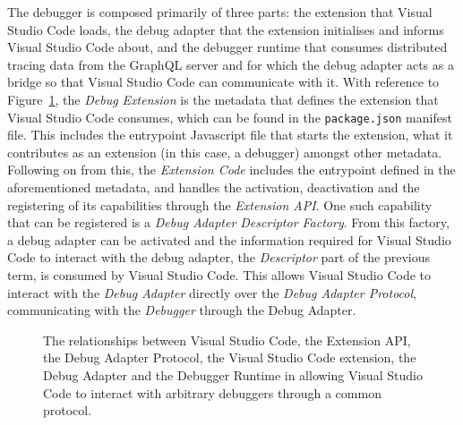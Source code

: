 \documentclass[12pt,pdftex,titlepage]{report}
\begin{document}
                The debugger is composed primarily of three parts: the extension that Visual Studio Code loads, the debug adapter that the extension initialises and informs Visual Studio Code about, and the debugger runtime
                that consumes distributed tracing data from the GraphQL server and for which the debug adapter acts as a bridge so that Visual Studio Code can communicate with it. With reference to Figure~\ref{fig:vscodedebug},
                the \textit{Debug Extension} is the metadata that defines the extension that Visual Studio Code consumes, which can be found in the \texttt{package.json} manifest file. This includes the entrypoint Javascript file 
                that starts the extension, what it contributes as an extension (in this case, a debugger) amongst other metadata. Following on from this, the \textit{Extension Code} includes the entrypoint defined in the 
                aforementioned metadata, and handles the activation, deactivation and the registering of its capabilities through the \textit{Extension API}. One such capability that can be registered is a \textit{Debug Adapter 
                Descriptor Factory}. From this factory, a debug adapter can be activated and the information required for Visual Studio Code to interact with the debug adapter, the \textit{Descriptor} part of the previous term, 
                is consumed by Visual Studio Code. This allows Visual Studio Code to interact with the \textit{Debug Adapter} directly over the \textit{Debug Adapter Protocol}, communicating with the \textit{Debugger} through the 
                Debug Adapter.

                \begin{figure}[hbt!]
                    \centering
                        \caption{The relationships between Visual Studio Code, the Extension API, the Debug Adapter Protocol, the Visual Studio Code extension, the Debug Adapter and the Debugger Runtime in allowing
                        Visual Studio Code to interact with arbitrary debuggers through a common protocol.}
                        \label{fig:vscodedebug}
                    \end{figure}
\end{document}
